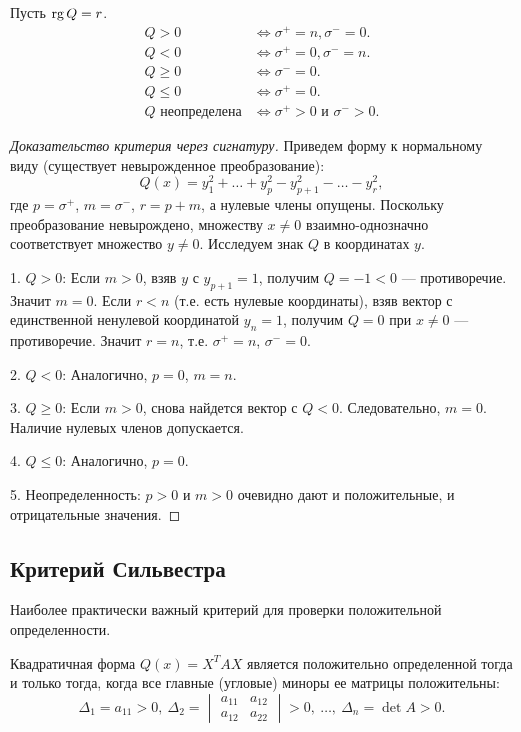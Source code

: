 \documentclass[12pt]{article}
\begin{document}
\begin{theorem}
Пусть $\operatorname{rg} Q = r$.
\begin{align*}
Q > 0 &\iff \sigma^+ = n, \sigma^- = 0. \\
Q < 0 &\iff \sigma^+ = 0, \sigma^- = n. \\
Q \ge 0 &\iff \sigma^- = 0. \\
Q \le 0 &\iff \sigma^+ = 0. \\
Q \text{ неопределена} &\iff \sigma^+ > 0 \text{ и } \sigma^- > 0.
\end{align*}
\end{theorem}

\begin{proof}[Доказательство критерия через сигнатуру]
Приведем форму к нормальному виду (существует невырожденное преобразование):
\[
Q(x) = y_1^2 + \dots + y_p^2 - y_{p+1}^2 - \dots - y_r^2,
\]
где $p=\sigma^+$, $m=\sigma^-$, $r=p+m$, а нулевые члены опущены. Поскольку преобразование невырождено, множеству $x\neq0$ взаимно-однозначно соответствует множество $y\neq0$. Исследуем знак $Q$ в координатах $y$.

1. $Q>0$: Если $m>0$, взяв $y$ с $y_{p+1}=1$, получим $Q=-1<0$ — противоречие. Значит $m=0$. Если $r<n$ (т.е. есть нулевые координаты), взяв вектор с единственной ненулевой координатой $y_n=1$, получим $Q=0$ при $x\neq0$ — противоречие. Значит $r=n$, т.е. $\sigma^+=n$, $\sigma^-=0$.

2. $Q<0$: Аналогично, $p=0$, $m=n$.

3. $Q\ge0$: Если $m>0$, снова найдется вектор с $Q<0$. Следовательно, $m=0$. Наличие нулевых членов допускается.

4. $Q\le0$: Аналогично, $p=0$.

5. Неопределенность: $p>0$ и $m>0$ очевидно дают и положительные, и отрицательные значения.
\end{proof}

\subsection{Критерий Сильвестра}
Наиболее практически важный критерий для проверки положительной определенности.

\begin{theorem}
Квадратичная форма $Q(x) = X^T A X$ является положительно определенной тогда и только тогда, когда все главные (угловые) миноры ее матрицы положительны:
\[
\Delta_1 = a_{11} > 0,\ \Delta_2 = \begin{vmatrix} a_{11} & a_{12} \\ a_{12} & a_{22} \end{vmatrix} > 0,\ \dots,\ \Delta_n = \det A > 0.
\]
\end{theorem}
\end{document}
